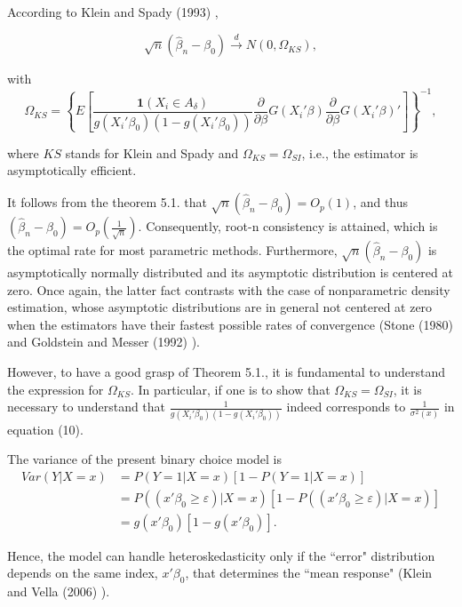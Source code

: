 \documentclass[a4paper]{article}
\begin{document}
\begin{theorem}
According to Klein and Spady (1993) \cite{[12]}, 

\[\sqrt{n}(\hat{\beta}_{n} - \beta_0) \stackrel{d}{\rightarrow} N(0,\Omega_{KS}),
\]

with  \[ \Omega_{KS} = \left\{ E\left[\frac{\mathbf{1}{(X_i \in A_\delta)}}{g(X_i'\beta_0)(1 - g(X_i'\beta_0))}\frac{\partial}{\partial \beta}
 G(X_i'\beta)\frac{\partial}{\partial \beta} G(X_i'\beta)' \right]\right\}^{-1}, \]
 
where $KS$ stands for Klein and Spady and $\Omega_{KS} = \Omega_{SI}$, i.e., the estimator is asymptotically efficient.

\end{theorem}

It follows from the theorem 5.1. that $\sqrt{n}(\hat{\beta}_n - \beta_0)=O_p(1)$, and thus $(\hat{\beta}_n - \beta_0) = O_p\left(\frac{1}{\sqrt{n}}\right)$.  Consequently, root-n consistency is attained, which is the optimal rate for most parametric methods. Furthermore, $\sqrt{n}(\hat{\beta}_n - \beta_0)$ is asymptotically normally distributed and its asymptotic distribution is centered at zero. Once again, the latter fact contrasts with the case of nonparametric density estimation, whose asymptotic distributions are in general not centered at zero when the estimators have their fastest possible rates of convergence (Stone (1980) \cite{[15]} and Goldstein and Messer (1992) \cite{[16]}). 

However, to have a good grasp of Theorem 5.1., it is fundamental to understand the expression for $\Omega_{KS}$. In particular, if one is to show that $\Omega_{KS} = \Omega_{SI}$, it is necessary to understand that $\frac{1}{g(X_i'\beta_0)(1 - g(X_i'\beta_0))}$ indeed corresponds to $\frac{1}{\sigma^2(x)}$ in equation (10). 

The variance of the present binary choice model is %
\begin{align*}
Var(Y|X = x) & = P(Y = 1|X = x)[1 - P(Y = 1|X = x)] \\
&=P((x'\beta_0 \geq \varepsilon)|X = x)[1 - P((x'\beta_0 \geq \varepsilon)|X = x)] \\
&= g(x'\beta_0)[1 - g(x'\beta_0)].
\end{align*} 

Hence, the model can handle heteroskedasticity only if the ``error" distribution depends on the same index, $ x'\beta_0$, that determines the ``mean response" (Klein and Vella (2006) \cite{[25]}).
\end{document}
